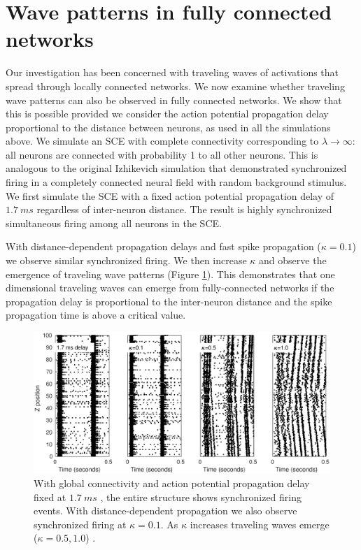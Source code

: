 \FloatBarrier

\section{Wave patterns in fully connected networks} \label{sub:delay}
Our investigation has been concerned with traveling waves of activations that spread through locally connected networks.
We now examine whether traveling wave patterns can also be observed in fully connected networks.
We show that this is possible provided we consider the action potential propagation delay proportional to the distance between neurons, as used in all the simulations above.
We simulate an SCE with complete connectivity corresponding to $\lambda \rightarrow \infty$: all neurons are connected with probability 1 to all other neurons.
This is analogous to the original Izhikevich simulation \citet{izhikevich2003} that demonstrated synchronized firing in a completely connected neural field with random background stimulus.
We first simulate the SCE with a fixed action potential propagation delay of $1.7~ms$ \citet{Markram1997}  regardless of inter-neuron distance.
The result is highly synchronized simultaneous firing among all neurons in the SCE.
 
With distance-dependent propagation delays and fast spike propagation ($\kappa=0.1$) we observe similar synchronized firing.
We then increase $\kappa$ and observe the emergence of traveling wave patterns (Figure \ref{fig:delay_waves}). 
This demonstrates that one dimensional traveling waves can emerge from fully-connected networks if the propagation delay is proportional to the inter-neuron distance and the spike propagation time is above a critical value.
\begin{figure}[!htb]
 \centering
   \includegraphics[width=\textwidth]{fig/DelayWaves}  
 \caption{With global connectivity and action potential propagation delay fixed at $1.7~ms$ , the entire structure shows synchronized firing events.
          With distance-dependent propagation we also observe synchronized firing at $\kappa=0.1$.
          As $\kappa$ increases traveling waves emerge ($\kappa=0.5, 1.0$) .}
 \label{fig:delay_waves}
\end{figure}

